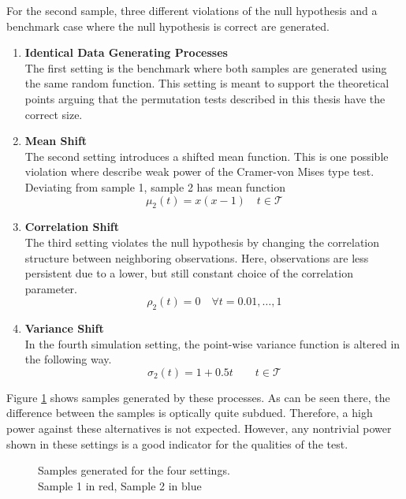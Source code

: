 \documentclass[12pt, a4paper]{article}
\theoremstyle{MAstyle} \newtheorem{assumption}{Assumption}[section]
\theoremstyle{MAstyle} \newtheorem{definition}{Definition}[section]
\theoremstyle{MAstyle} \newtheorem{theorem}{Theorem}[section]
\begin{document}
		For the second sample, three different violations of the null hypothesis and a benchmark case where the null hypothesis is correct are generated.
		\begin{enumerate}
			\item \textbf{Identical Data Generating Processes}\\
				  The first setting is the benchmark where both samples are generated using the same random function. This setting is meant to support the theoretical points arguing that the permutation tests described in this thesis have the correct size.
			\item \textbf{Mean Shift}\\
				  The second setting introduces a shifted mean function. This is one possible violation where \cite{bugni_permutation_2021} describe weak power of the Cramer-von Mises type test. Deviating from sample 1, sample 2 has mean function 
				  $$\mu_2(t) = x (x-1) \quad t \in \mathcal{T}$$
			\item \textbf{Correlation Shift}\\
			 	  The third setting violates the null hypothesis by changing the correlation structure between neighboring observations. Here, observations are less persistent due to a lower, but still constant choice of the correlation parameter.
			 	  $$\rho_2(t) = 0 \quad \forall t = 0.01, \dots, 1$$
			\item \textbf{Variance Shift}\\
				  In the fourth simulation setting, the point-wise variance function is altered in the following way.
				  $$\sigma_2(t) = 1 + 0.5t \quad \quad t \in \mathcal{T}$$
		\end{enumerate}
	
		Figure \ref{settings} shows samples generated by these processes. As can be seen there, the difference between the samples is optically quite subdued. Therefore, a high power against these alternatives is not expected. However, any nontrivial power shown in these settings is a good indicator for the qualities of the test.
		\begin{figure}[H]
			\caption{Samples generated for the four settings. \\
			Sample 1 in red, Sample 2 in blue}
			\label{settings}
		\end{figure}
		
\end{document}

